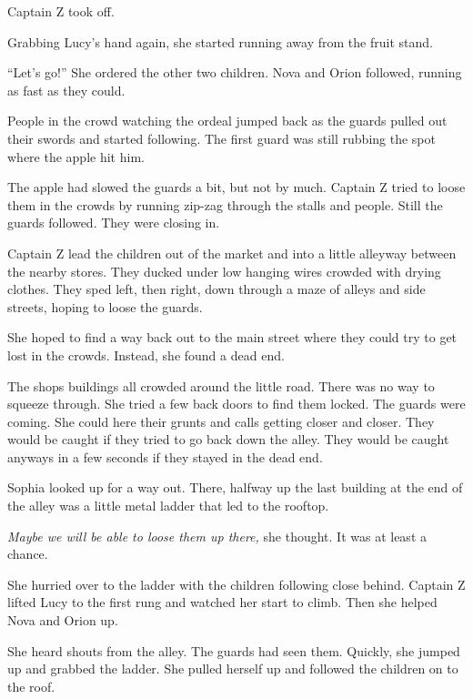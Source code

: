 \documentclass[12pt]{extbook}
\begin{document}
  Captain Z took off.
  
  Grabbing Lucy's hand again, she started running away from the fruit
  stand.
  
  \enquote{Let's go!} She ordered the other two children. Nova and Orion
  followed, running as fast as they could.
  
  People in the crowd watching the ordeal jumped back as the guards pulled
  out their swords and started following. The first guard was still
  rubbing the spot where the apple hit him.
  
  The apple had slowed the guards a bit, but not by much. Captain Z tried
  to loose them in the crowds by running zip-zag through the stalls and
  people. Still the guards followed. They were closing in.
  
  Captain Z lead the children out of the market and into a little alleyway
  between the nearby stores. They ducked under low hanging wires crowded
  with drying clothes. They sped left, then right, down through a maze of
  alleys and side streets, hoping to loose the guards.
  
  She hoped to find a way back out to the main street where they could try
  to get lost in the crowds. Instead, she found a dead end.
  
  The shops buildings all crowded around the little road. There was no way
  to squeeze through. She tried a few back doors to find them locked. The
  guards were coming. She could here their grunts and calls getting closer
  and closer. They would be caught if they tried to go back down the
  alley. They would be caught anyways in a few seconds if they stayed in
  the dead end.
  
  Sophia looked up for a way out. There, halfway up the last building at
  the end of the alley was a little metal ladder that led to the rooftop.
  
  \emph{Maybe we will be able to loose them up there,} she thought. It was
  at least a chance.
  
  She hurried over to the ladder with the children following close behind.
  Captain Z lifted Lucy to the first rung and watched her start to climb.
  Then she helped Nova and Orion up.
  
  She heard shouts from the alley. The guards had seen them. Quickly, she
  jumped up and grabbed the ladder. She pulled herself up and followed the
  children on to the roof.
  
  \section{}\label{section-33}
  
\end{document}
